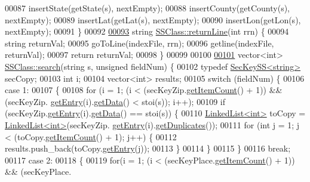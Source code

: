\begin{DoxyCode}
00087     insertState(getState(s), nextEmpty);
00088     insertCounty(getCounty(s), nextEmpty);
00089     insertLat(getLat(s), nextEmpty);
00090     insertLon(getLon(s), nextEmpty);
00091 \}
00092 
\hyperlink{classSSClass_ab0a8ea1af895df28359b5733bd920ef3}{00093} \textcolor{keywordtype}{string} \hyperlink{classSSClass_ab0a8ea1af895df28359b5733bd920ef3}{SSClass::returnLine}(\textcolor{keywordtype}{int} rrn) \{
00094     \textcolor{keywordtype}{string} returnVal;
00095     goToLine(indexFile, rrn);
00096     getline(indexFile, returnVal);
00097     \textcolor{keywordflow}{return} returnVal;
00098 \}
00099 
00100 
\hyperlink{classSSClass_a9df3598c000a6a5e9ef994d19196e69f}{00101} vector<int> \hyperlink{classSSClass_a9df3598c000a6a5e9ef994d19196e69f}{SSClass::search}(\textcolor{keywordtype}{string} s, \textcolor{keywordtype}{unsigned} fieldNum) \{
00102     \textcolor{keyword}{typedef} \hyperlink{classSecKeySS}{SecKeySS<string>} secCopy;
00103     \textcolor{keywordtype}{int} i;
00104     vector<int> results;
00105     \textcolor{keywordflow}{switch} (fieldNum) \{
00106     \textcolor{keywordflow}{case} 1:
00107     \{
00108         \textcolor{keywordflow}{for} (i = 1; (i < (secKeyZip.\hyperlink{classLinkedList_afc6635f854f48f2f126cf3b60d845220}{getItemCount}() + 1)) && (secKeyZip.
      \hyperlink{classLinkedList_a341bfd7772c9d24d29eb7a7f3936915b}{getEntry}(i).\hyperlink{classSecKeySS_a9fdb8a771250b7aaab556f019b381eab}{getData}() < stoi(s)); i++);
00109         \textcolor{keywordflow}{if} (secKeyZip.\hyperlink{classLinkedList_a341bfd7772c9d24d29eb7a7f3936915b}{getEntry}(i).\hyperlink{classSecKeySS_a9fdb8a771250b7aaab556f019b381eab}{getData}() == stoi(s)) \{
00110             \hyperlink{classLinkedList}{LinkedList<int>} toCopy = \hyperlink{classLinkedList}{LinkedList<int>}(secKeyZip.
      \hyperlink{classLinkedList_a341bfd7772c9d24d29eb7a7f3936915b}{getEntry}(i).\hyperlink{classSecKeySS_abef7c9c03e9bc6b818d599966428fdec}{getDuplicates}());
00111             \textcolor{keywordflow}{for} (\textcolor{keywordtype}{int} j = 1; j < (toCopy.\hyperlink{classLinkedList_afc6635f854f48f2f126cf3b60d845220}{getItemCount}() + 1); j++) \{
00112                 results.push\_back(toCopy.\hyperlink{classLinkedList_a341bfd7772c9d24d29eb7a7f3936915b}{getEntry}(j));
00113             \}
00114         \}
00115     \}
00116     \textcolor{keywordflow}{break};
00117     \textcolor{keywordflow}{case} 2:
00118     \{
00119         \textcolor{keywordflow}{for}(i = 1; (i < (secKeyPlace.\hyperlink{classLinkedList_afc6635f854f48f2f126cf3b60d845220}{getItemCount}() + 1)) && (secKeyPlace.

\end{DoxyCode}
